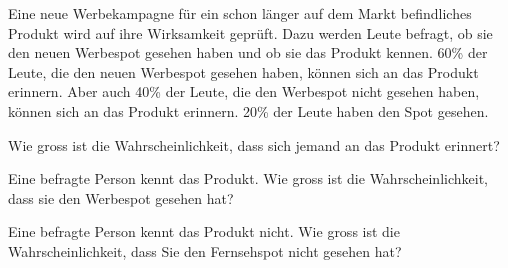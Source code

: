 Eine neue Werbekampagne für ein schon länger auf dem Markt
befindliches Produkt wird auf ihre Wirksamkeit geprüft.
Dazu werden Leute befragt, ob sie den neuen Werbespot gesehen
haben und ob sie das Produkt kennen.
60\% der Leute, die den neuen Werbespot gesehen haben,
können sich an das Produkt erinnern. Aber auch 40\% der
Leute, die den Werbespot nicht gesehen haben, können sich
an das Produkt erinnern. 20\% der Leute haben den Spot gesehen.
\begin{teilaufgaben}
\item Wie gross ist die Wahrscheinlichkeit, dass sich jemand
an das Produkt erinnert?
\item Eine befragte Person kennt das Produkt. Wie gross ist
die Wahrscheinlichkeit, dass sie den Werbespot gesehen hat?
\item  Eine befragte Person kennt das Produkt nicht. Wie gross
ist die Wahrscheinlichkeit, dass Sie den Fernsehspot nicht
gesehen hat?
\end{teilaufgaben}

